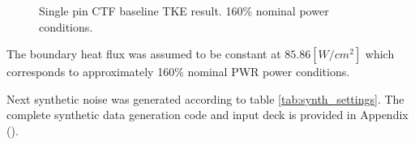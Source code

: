 \begin{figure}[H]%
    \centering
    \qquad
    \caption[Single pin CTF baseline TKE result.  160\% nominal power conditions.]{Single pin CTF baseline TKE result.  160\% nominal power conditions.}%
    \label{fig:ctf_tke_orig}%
\end{figure}


The boundary heat flux was assumed to be constant at $85.86 [W/cm^2]$ which corresponds to approximately 160\% nominal PWR power conditions.

Next synthetic noise was generated according to table \ref{tab:synth_settings}.  The complete synthetic data generation code and input deck is provided in Appendix ().

